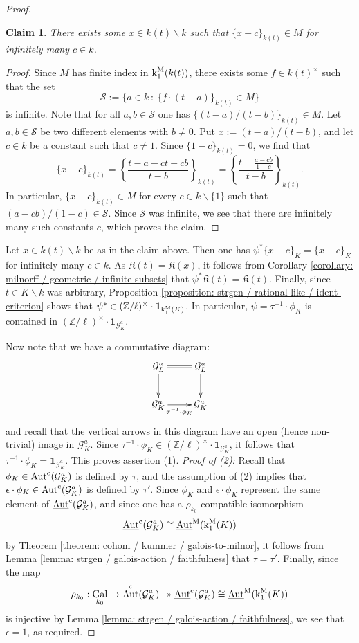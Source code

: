 \documentclass[11pt]{amsart}
\newtheorem*{claim*}{Claim}
\theoremstyle{definition}
\theoremstyle{remark}
\numberwithin{equation}{section}
\DeclareMathOperator{\Aut}{Aut}
\DeclareMathOperator{\Gal}{Gal}
\newcommand{\Z}{\mathbb{Z}}
\newcommand{\Gc}{\mathcal{G}}
\newcommand{\Kfrak}{\mathfrak{K}}
\newcommand{\Autc}{\Aut^{\rm c}}
\newcommand{\UAutc}{\underline{\Aut}^{\rm c}}
\newcommand{\UAutm}{\underline{\Aut}^{\rm M}}
\renewcommand{\k}{\operatorname{k}^{\rm M}}
\newcommand{\one}{\mathbf{1}}
\newcommand{\Galk}{{\Gal_{k_0}}}
\begin{document}
\begin{proof}
  \begin{claim*}
    There exists some $x \in k(t) \smallsetminus k$ such that $\{x-c\}_{k(t)} \in M$ for infinitely many $c \in k$.
  \end{claim*}
  \begin{proof}
    Since $M$ has finite index in $\k_1(k(t))$, there exists some $f \in k(t)^\times$ such that the set 
    \[ \mathcal{S} := \{a \in k \ : \ \{f \cdot (t-a)\}_{k(t)} \in M\} \]
    is infinite.
    Note that for all $a,b \in \mathcal{S}$ one has $\{(t-a)/(t-b)\}_{k(t)} \in M$.
    Let $a,b \in \mathcal{S}$ be two different elements with $b \neq 0$.
    Put $x := (t-a)/(t-b)$, and let $c \in k$ be a constant such that $c \neq 1$.
    Since $\{1-c\}_{k(t)} = 0$, we find that
    \[ \{x-c\}_{k(t)} = \left\{\frac{t-a-ct+cb}{t-b}\right\}_{k(t)} = \left\{\frac{t-\frac{a-cb}{1-c}}{t-b}\right\}_{k(t)}.\]
    In particular, $\{x-c\}_{k(t)} \in M$ for every $c \in k \smallsetminus \{1\}$ such that $(a-cb)/(1-c) \in \mathcal{S}$.
    Since $\mathcal{S}$ was infinite, we see that there are infinitely many such constants $c$, which proves the claim.
  \end{proof}

  Let $x \in k(t) \smallsetminus k$ be as in the claim above.
  Then one has $\psi^*\{x-c\}_K = \{x-c\}_K$ for infinitely many $c \in k$.
  As $\Kfrak(t) = \Kfrak(x)$, it follows from Corollary \ref{corollary: milnorff / geometric / infinite-subsets} that $\psi^* \Kfrak(t) = \Kfrak(t)$.
  Finally, since $t \in K \smallsetminus k$ was arbitrary, Proposition \ref{proposition: strgen / rational-like / ident-criterion} shows that $\psi^* \in (\Z/\ell)^\times \cdot \one_{\k_1(K)}$.
  In particular, $\psi = \tau^{-1} \cdot \phi_K$ is contained in $(\Z/\ell)^\times \cdot \one_{\Gc_K^a}$.

  Now note that we have a commutative diagram:
  \[ 
  \xymatrix{
    \Gc_L^a \ar[d] \ar@{=}[r] & \Gc_L^a \ar[d] \\
    \Gc_K^a \ar[r]_{\tau^{-1} \cdot \phi_K} & \Gc_K^a
  }
  \]
  and recall that the vertical arrows in this diagram have an open (hence non-trivial) image in $\Gc_K^a$.
  Since $\tau^{-1} \cdot \phi_K \in (\Z/\ell)^\times \cdot \one_{\Gc_K^a}$, it follows that $\tau^{-1} \cdot \phi_K = \one_{\Gc_K^a}$.
  This proves assertion (1).
  \vskip 5pt
  \noindent\emph{Proof of (2):}
  Recall that $\phi_K \in \Autc(\Gc_K^a)$ is defined by $\tau$, and the assumption of (2) implies that $\epsilon \cdot \phi_K \in \Autc(\Gc_K^a)$ is defined by $\tau'$.
  Since $\phi_K$ and $\epsilon \cdot \phi_K$ represent the same element of $\UAutc(\Gc_K^a)$, and since one has a $\rho_{k_0}$-compatible isomorphism 
  \[ \UAutc(\Gc_K^a) \cong \UAutm(\k_1(K)) \]
  by Theorem \ref{theorem: cohom / kummer / galois-to-milnor}, it follows from Lemma \ref{lemma: strgen / galois-action / faithfulness} that $\tau = \tau'$.
  Finally, since the map 
  \[ \rho_{k_0} : \Galk \rightarrow \Autc(\Gc_K^a) \twoheadrightarrow \UAutc(\Gc_K^a) \cong \UAutm(\k_1(K)) \]
  is injective by Lemma \ref{lemma: strgen / galois-action / faithfulness}, we see that $\epsilon = 1$, as required.
\end{proof}
\end{document}
